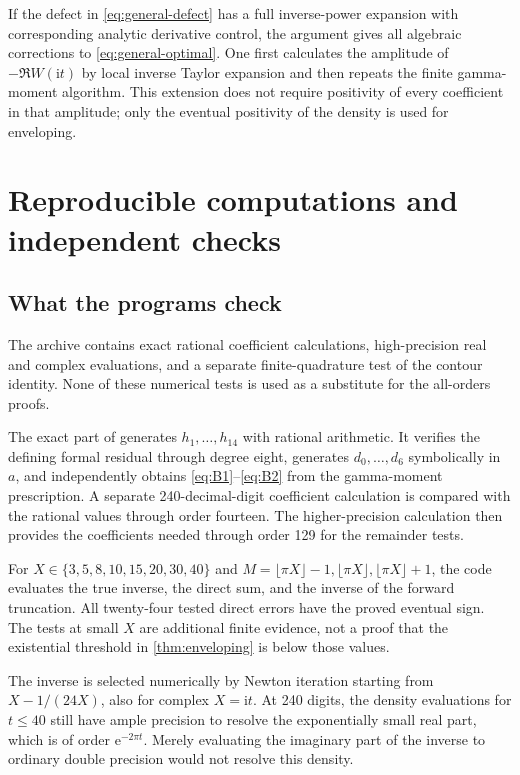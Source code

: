 \documentclass[11pt,a4paper]{article}
\theoremstyle{definition}
\numberwithin{equation}{section}
\newcommand{\ii}{\mathrm{i}}
\newcommand{\ee}{\mathrm{e}}
\begin{document}
If the defect in \eqref{eq:general-defect} has a full inverse-power expansion with corresponding analytic derivative control, the argument gives all algebraic corrections to \eqref{eq:general-optimal}. One first calculates the amplitude of $-\Re W(\ii t)$ by local inverse Taylor expansion and then repeats the finite gamma-moment algorithm. This extension does not require positivity of every coefficient in that amplitude; only the eventual positivity of the density is used for enveloping.

\section{Reproducible computations and independent checks}
\label{sec:computation}

\subsection{What the programs check}
The archive contains exact rational coefficient calculations, high-precision real and complex evaluations, and a separate finite-quadrature test of the contour identity. None of these numerical tests is used as a substitute for the all-orders proofs.

The exact part of  generates $h_1,\ldots,h_{14}$ with rational arithmetic. It verifies the defining formal residual through degree eight, generates $d_0,\ldots,d_6$ symbolically in $a$, and independently obtains \eqref{eq:B1}--\eqref{eq:B2} from the gamma-moment prescription. A separate 240-decimal-digit coefficient calculation is compared with the rational values through order fourteen. The higher-precision calculation then provides the coefficients needed through order 129 for the remainder tests.

For $X\in\{3,5,8,10,15,20,30,40\}$ and
$M=\lfloor\pi X\rfloor-1,\lfloor\pi X\rfloor,\lfloor\pi X\rfloor+1$,
the code evaluates the true inverse, the direct sum, and the inverse of the forward truncation. All twenty-four tested direct errors have the proved eventual sign. The tests at small $X$ are additional finite evidence, not a proof that the existential threshold in \cref{thm:enveloping} is below those values.

The inverse is selected numerically by Newton iteration starting from $X-1/(24X)$, also for complex $X=\ii t$. At 240 digits, the density evaluations for $t\le40$ still have ample precision to resolve the exponentially small real part, which is of order $\ee^{-2\pi t}$. Merely evaluating the imaginary part of the inverse to ordinary double precision would not resolve this density.
\end{document}
